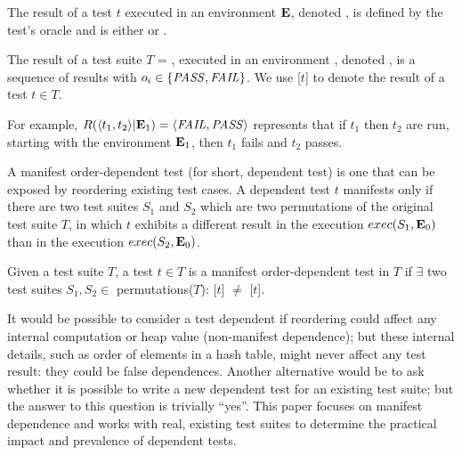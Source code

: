 \begin{definition}
The result of a test $t$ executed in an environment\/ $\mathbf{E}$,
denoted\/ , is defined by the test's oracle
and is either \pass or \fail.

The result of a test suite\/ $T$ = , executed in an
environment\/ \env, denoted\/ , is a
sequence of results\/  with $o_i \in \{\mathit{PASS},\mathit{FAIL}\}$.
We use [$t$] to denote the result of a test $t \in T$.


For example, $R( \langle t_1, t_2 \rangle |\mathbf{E}_1) =  \langle \mathit{FAIL}, \mathit{PASS} \rangle $ represents that if
$t_1$ then $t_2$ are run, starting with the environment\/ $\mathbf{E}_1$, then\/
$t_1$ fails and\/ $t_2$ passes.
\end{definition}

A manifest order-dependent test (for short, dependent test)
is one that can be exposed by 
reordering existing test cases.
A dependent test $t$ manifests only
if there are two test suites $S_1$ and $S_2$ which
are two permutations of the original test suite $T$,
in which $t$ exhibits a different result
in the execution $exec(S_1,\mathbf{E}_0)$
than in the execution $exec(S_2,\mathbf{E}_0)$.

\begin{definition} \label{def:manifest}
Given a test suite\/ $T$, a test $t \in T$ is a
manifest order-dependent test in $T$ if $\exists$ two test suites
$S_1, S_2 \in$ permutations($T$):
[$t$] $\neq$
[$t$].
%
\end{definition}

It would be possible to consider a test dependent if reordering could
affect any internal computation or heap value (non-manifest dependence);
but these internal details, such as order of elements in a hash table,
might never affect any test result: they could be false dependences.
Another alternative would be to ask
whether it is possible to write a new dependent test for an existing
test suite; but the answer to this question is trivially ``yes''.
This paper focuses on manifest dependence and works with real, existing
test suites to determine the practical impact and prevalence of dependent
tests.


